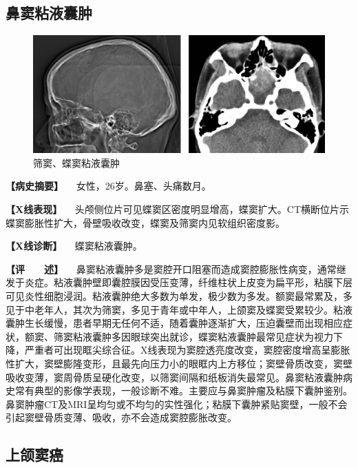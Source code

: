 \subsection{鼻窦粘液囊肿}

\begin{figure}[!htbp]
 \centering
 \includegraphics{./images/Image00432.jpg}
 \captionsetup{justification=centering}
 \caption{筛窦、蝶窦粘液囊肿}
 \label{fig7-4-6}
  \end{figure} 

\textbf{【病史摘要】} 　女性，26岁。鼻塞、头痛数月。

\textbf{【X线表现】}
　头颅侧位片可见蝶窦区密度明显增高，蝶窦扩大。CT横断位片示蝶窦膨胀性扩大，骨壁吸收改变，蝶窦及筛窦内见软组织密度影。

\textbf{【X线诊断】} 　蝶窦粘液囊肿。

\textbf{【评　　述】}
　鼻窦粘液囊肿多是窦腔开口阻塞而造成窦腔膨胀性病变，通常继发于炎症。粘液囊肿壁即囊腔膜因受压变薄，纤维柱状上皮变为扁平形，粘膜下层可见炎性细胞浸润。粘液囊肿绝大多数为单发，极少数为多发。额窦最常累及，多见于中老年人，其次为筛窦，多见于青年或中年人，上颌窦及蝶窦受累较少。粘液囊肿生长缓慢，患者早期无任何不适，随着囊肿逐渐扩大，压迫囊壁而出现相应症状，额窦、筛窦粘液囊肿多因眼球突出就诊，蝶窦粘液囊肿最常见症状为视力下降，严重者可出现眶尖综合征。X线表现为窦腔透亮度改变，窦腔密度增高呈膨胀性扩大，窦壁膨隆变形，且最先向压力小的眼眶内上方移位；窦壁骨质改变，窦壁吸收变薄，窦周骨质呈硬化改变，以筛窦间隔和纸板消失最常见。鼻窦粘液囊肿病史常有典型的影像学表现，一般诊断不难。主要应与鼻窦肿瘤及粘膜下囊肿鉴别。鼻窦肿瘤CT及MRI呈均匀或不均匀的实性强化；粘膜下囊肿紧贴窦壁，一般不会引起窦壁骨质变薄、吸收，亦不会造成窦腔膨胀改变。

\subsection{上颌窦癌}

